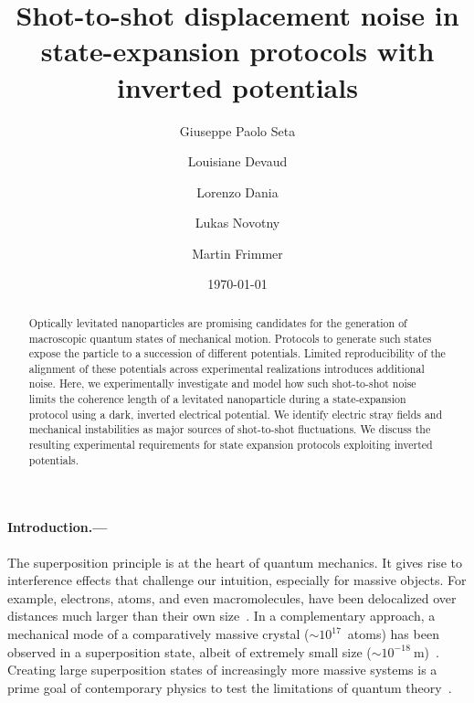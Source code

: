 \documentclass[aps,prl,reprint,twocolumn,superscriptaddress]{revtex4-2}
\begin{document}
\title{Shot-to-shot displacement noise in state-expansion protocols with inverted potentials}

\author{Giuseppe Paolo Seta }
\author{Louisiane Devaud}
\author{Lorenzo Dania}
\author{Lukas Novotny}
\author{Martin Frimmer}


\date{\today}

\begin{abstract}
Optically levitated nanoparticles are promising candidates for the generation of macroscopic quantum states of mechanical motion. 
Protocols to generate such states expose the particle to a succession of different potentials. 
Limited reproducibility of the alignment of these potentials across experimental realizations introduces additional noise. 
Here, we experimentally investigate and model how such shot-to-shot noise limits the coherence length of a levitated nanoparticle during a state-expansion protocol using a dark, inverted electrical potential. 
We identify electric stray fields and mechanical instabilities as major sources of shot-to-shot fluctuations. 
We discuss the resulting experimental requirements for state expansion protocols exploiting inverted potentials. 

\end{abstract}

\maketitle

\paragraph{Introduction.—}
\label{sec:introduction}
The superposition principle is at the heart of quantum mechanics. It gives rise to interference effects that challenge our intuition, especially for massive objects. For example, electrons, atoms, and even macromolecules, have been delocalized over distances much larger than their own size~\cite{davisson1927scattering,Monroe1996schroedingerCat,Schumm2005matter-wave,hornberger2012quantum,fein2019quantum}. 
In a complementary approach, a mechanical mode of a comparatively massive crystal ($\sim10^{17}$~atoms) has been observed in a superposition state, albeit of extremely small size ($\sim10^{-18}~$m)~\cite{Bild2023schroedingerCat}.
Creating large superposition states of increasingly more massive systems is a prime goal of contemporary physics to test the limitations of quantum theory~\cite{bassi2013models}. 
\end{document}
